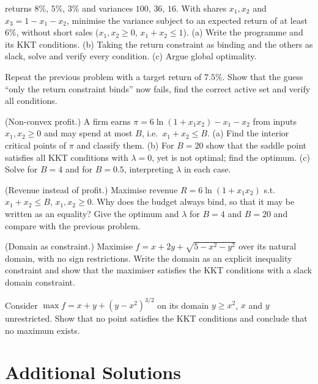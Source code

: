 \begin{problems}
        returns $8\%$, $5\%$, $3\%$ and variances $100$, $36$, $16$. With
        shares $x_1,x_2$ and $x_3=1-x_1-x_2$, minimise the variance subject
        to an expected return of at least $6\%$, without short sales
        ($x_1,x_2\ge0$, $x_1+x_2\le1$). (a) Write the programme and its KKT
        conditions. (b) Taking the return constraint as binding and the
        others as slack, solve and verify every condition. (c) Argue global
        optimality.
  \item Repeat the previous problem with a target return of $7.5\%$. Show
        that the guess ``only the return constraint binds'' now fails, find
        the correct active set and verify all conditions.
  \item (Non-convex profit.) A firm earns $\pi=6\ln(1+x_1x_2)-x_1-x_2$
        from inputs $x_1,x_2\ge0$ and may spend at most $B$, i.e.\
        $x_1+x_2\le B$. (a) Find the interior critical points of $\pi$ and
        classify them. (b) For $B=20$ show that the saddle point satisfies
        all KKT conditions with $\lambda=0$, yet is not optimal; find the
        optimum. (c) Solve for $B=4$ and for $B=0.5$, interpreting
        $\lambda$ in each case.
  \item (Revenue instead of profit.) Maximise revenue $R=6\ln(1+x_1x_2)$
        s.t.\ $x_1+x_2\le B$, $x_1,x_2\ge0$. Why does the budget always
        bind, so that it may be written as an equality? Give the optimum and
        $\lambda$ for $B=4$ and $B=20$ and compare with the previous
        problem.
  \item (Domain as constraint.) Maximise $f=x+2y+\sqrt{5-x^{2}-y^{2}}$
        over its natural domain, with no sign restrictions. Write the domain
        as an explicit inequality constraint and show that the maximiser
        satisfies the KKT conditions with a slack domain constraint.
  \item Consider $\max f=x+y+(y-x^{2})^{3/2}$ on its domain $y\ge x^{2}$,
        $x$ and $y$ unrestricted. Show that no point satisfies the KKT
        conditions and conclude that no maximum exists.
\end{problems}

\section{Additional Solutions}

